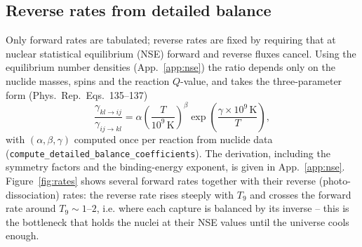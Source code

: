 \documentclass[11pt,a4paper]{article}
\newcommand{\PR}{Phys.\ Rep.}
\begin{document}
\subsection{Reverse rates from detailed balance}
Only forward rates are tabulated; reverse rates are fixed by requiring that at
nuclear statistical equilibrium (NSE) forward and reverse fluxes cancel. Using
the equilibrium number densities (App.~\ref{app:nse}) the ratio depends only on
the nuclide masses, spins and the reaction $Q$-value, and takes the
three-parameter form (\PR\ Eqs.~135--137)
\begin{equation}
  \frac{\gamma_{kl\to ij}}{\gamma_{ij\to kl}}
    = \alpha\left(\frac{T}{10^9\,\mathrm K}\right)^{\!\beta}
      \exp\!\left(\frac{\gamma\times10^9\,\mathrm K}{T}\right),
\label{eq:detbal}
\end{equation}
with $(\alpha,\beta,\gamma)$ computed once per reaction from nuclide data
(\texttt{compute\_detailed\_\allowbreak balance\_coefficients}). The derivation, including the
symmetry factors and the binding-energy exponent, is given in
App.~\ref{app:nse}. Figure~\ref{fig:rates} shows several forward rates together
with their reverse (photo-dissociation) rates: the reverse rate rises steeply
with $T_9$ and crosses the forward rate around $T_9\sim1$--$2$, i.e. where each
capture is balanced by its inverse -- this is the bottleneck that holds the
nuclei at their NSE values until the universe cools enough.
\end{document}
